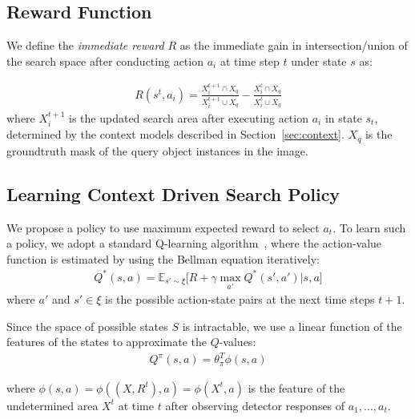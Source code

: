 \subsection{Reward Function}

We define the \textit{immediate reward} $R$ as the immediate gain in intersection/union of the search space after conducting action $a_i$ at time step $t$ under state $s$ as:

\begin{eqnarray}
\label{eq:imreward}
R(s^t,a_i) =  \frac{X^{t+1}_i \cap X_q}{X^{t+1}_i \cup X_q} - \frac{X^{t}_i \cap X_q}{X^{t}_i \cup X_q}
\end{eqnarray}
where $X^{t+1}_i$ is the updated search area after executing action $a_i$ in state $s_t$, determined by the context models described in Section~\ref{sec:context}. $X_q$ is the groundtruth mask of the query object instances in the image. 
  




\subsection{Learning Context Driven Search Policy}
We propose a policy to use maximum expected reward to select $a_t$. To learn such a policy, we adopt a standard Q-learning algorithm~\cite{barto1998reinforcement}, where the action-value function is estimated by using the Bellman equation iteratively:
\begin{eqnarray}
\label{eq:bellman}
Q^*(s,a) = \mathbb{E}_{s'\sim \xi} \big[ R + \gamma \max_{a'} Q^*(s',a')|s,a \big]
\end{eqnarray}
where $a'$ and $s'\in\xi$ is the possible action-state pairs at the next time steps $t+1$.

Since the space of possible states $S$ is intractable, we use a linear function of the features of the states to approximate the $Q$-values:
\begin{eqnarray}
\label{eq:qvalue}
Q^{\pi}(s,a) = \theta_\pi^T \phi(s,a) 
\end{eqnarray}

where $\phi(s,a) = \phi((X, R^t),a) = \phi(X^t,a)$ is the feature of the undetermined area $X^t$ at time $t$ after observing detector responses of $a_1,...,a_t$. 

